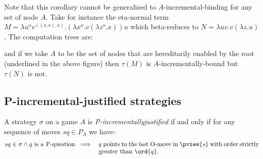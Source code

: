 Note that this corollary  cannot be generalized to
$A$-incremental-binding for any set of node $A$. Take for instance
the eta-normal term $M = \lambda u^{o} v^{((o,o),o)} . (\lambda x^o
. v (\lambda z^o . x)) u$ which beta-reduces to $N = \lambda u v . v
(\lambda z . u)$. The computation trees are:
\begin{center}
\end{center}
and if we take $A$ to be the set of nodes that are hereditarily enabled by
the root (underlined in the above figure) then $\tau(M)$
is $A$-incrementally-bound but $\tau(N)$ is not.


\subsection{P-incremental-justified strategies}
\begin{definition}
A strategy $\sigma$ on a game $A$ is
\emph{P-incrementally\-justified} if and only if for any sequence of
moves $s q \in P_A$ we have:
\begin{eqnarray*}
s q \in \sigma \wedge q \mbox{ is a P-question } &\implies&
\parbox[t]{9cm}{$q$  points to the last O-move in $\pview{s}$
with order strictly greater than $\ord{q}$.}
\end{eqnarray*}
\end{definition}




